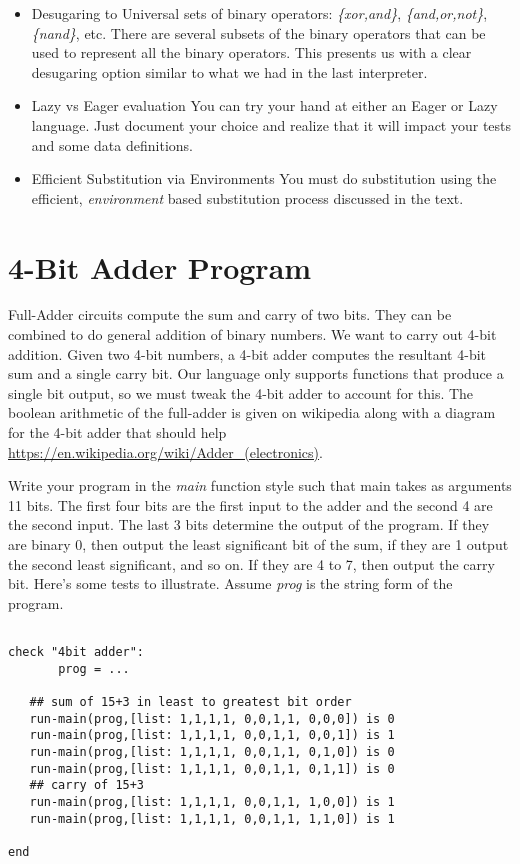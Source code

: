 \documentclass[10pt]{article}
\begin{document}
\begin{itemize}
 
\item Desugaring to Universal sets of binary operators: \textit{\{xor,and\}}, \textit{\{and,or,not\}}, \textit{\{nand\}}, etc.
\newline
There are several subsets of the binary operators that can be used to represent all the binary operators. This presents us with a clear desugaring option similar to what we had in the last interpreter. 

\item Lazy vs Eager evaluation
\newline
You can try your hand at either an Eager or Lazy language. Just document your choice and realize that it will impact your tests and some data definitions.

\item Efficient Substitution via Environments
\newline
You must do substitution using the efficient, \textit{environment} based substitution process discussed in the text. 
\end{itemize}

\section{4-Bit Adder Program}

Full-Adder circuits compute the sum and carry of two bits.  They can be combined to do general addition of binary numbers. We want to carry out 4-bit addition. Given two 4-bit numbers, a 4-bit adder computes the resultant 4-bit sum and a single carry bit. Our language only supports functions that produce a single bit output, so we must tweak the 4-bit adder to account for this. The boolean arithmetic of the full-adder is given on wikipedia along with a diagram for the 4-bit adder that should help \url{https://en.wikipedia.org/wiki/Adder_(electronics)}. 

Write your program in the \textit{main} function style such that main takes as arguments 11 bits. The first four bits are the first input to the adder and the second 4 are the second input. The last 3 bits determine the output of the program. If they are binary 0, then output the least significant bit of the sum, if they are 1 output the second least significant, and so on. If they are 4 to 7, then output the carry bit. Here's some tests to illustrate. Assume \textit{prog} is the string form of the program.

\begin{verbatim}

check "4bit adder":
	   prog = ...
   
   ## sum of 15+3 in least to greatest bit order
   run-main(prog,[list: 1,1,1,1, 0,0,1,1, 0,0,0]) is 0
   run-main(prog,[list: 1,1,1,1, 0,0,1,1, 0,0,1]) is 1
   run-main(prog,[list: 1,1,1,1, 0,0,1,1, 0,1,0]) is 0
   run-main(prog,[list: 1,1,1,1, 0,0,1,1, 0,1,1]) is 0   
   ## carry of 15+3   
   run-main(prog,[list: 1,1,1,1, 0,0,1,1, 1,0,0]) is 1  
   run-main(prog,[list: 1,1,1,1, 0,0,1,1, 1,1,0]) is 1   

end

\end{verbatim}
\end{document}

